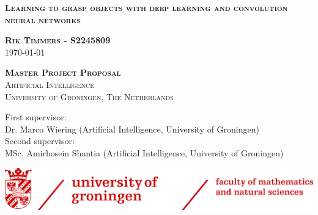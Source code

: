 \documentclass[a4paper,10pt]{article}
\begin{document}
\begin{titlepage}
  \centering
  {\scshape\LARGE \textbf{Learning to grasp objects with deep learning and convolution neural networks} \par}
  \vspace{2cm}
  {\scshape \Large \textbf{Rik Timmers - S2245809} \\ 
  \today \par}
  \vspace{2cm}
  {\scshape\Large \textbf{Master Project Proposal} \\
  Artificial Intelligence \\
  University of Groningen, The Netherlands}
  \vfill
  \begin{flushleft}
  First supervisor: \\
  Dr. Marco Wiering (Artificial Intelligence, University of Groningen) \\
  Second supervisor: \\
  MSc. Amirhosein Shantia (Artificial Intelligence, University of Groningen)
  \end{flushleft}
  \includegraphics[width=\textwidth]{logo}
\end{titlepage}









\end{document}
